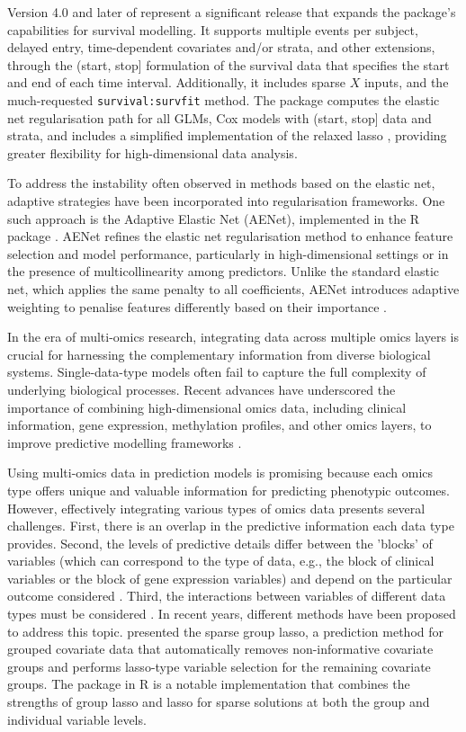 Version 4.0 and later of  \citep{friedman2023glmnet} represent a significant release that expands the package's capabilities for survival modelling. It supports multiple events per subject, delayed entry, time-dependent covariates and/or strata, and other extensions, through the (start, stop] formulation of the survival data that specifies the start and end of each time interval. Additionally, it includes sparse $X$ inputs, and the much-requested \texttt{survival:survfit} method. The package computes the elastic net regularisation path for all GLMs, Cox models with (start, stop] data and strata, and includes a simplified implementation of the relaxed lasso \citep{hastie2020best}, providing greater flexibility for high-dimensional data analysis.

To address the instability often observed in methods based on the elastic net, adaptive strategies have been incorporated into regularisation frameworks. One such approach is the Adaptive Elastic Net (AENet), implemented in the R package . AENet refines the elastic net regularisation method to enhance feature selection and model performance, particularly in high-dimensional settings or in the presence of multicollinearity among predictors. Unlike the standard elastic net, which applies the same penalty to all coefficients, AENet introduces adaptive weighting to penalise features differently based on their importance \citep{zou2009adaptive}.

In the era of multi-omics research, integrating data across multiple omics layers is crucial for harnessing the complementary information from diverse biological systems. Single-data-type models often fail to capture the full complexity of underlying biological processes. Recent advances have underscored the importance of combining high-dimensional omics data, including clinical information, gene expression, methylation profiles, and other omics layers, to improve predictive modelling frameworks \citep{huang2017more}.

Using multi-omics data in prediction models is promising because each omics type offers unique and valuable information for predicting phenotypic outcomes.  However, effectively integrating various types of omics data presents several challenges. First, there is an overlap in the predictive information each data type provides. Second, the levels of predictive details differ between the 'blocks' of variables (which can correspond to the type of data, e.g., the block of clinical variables or the block of gene expression variables) and depend on the particular outcome considered \citep{QingZhaoCombinmultidimensional}. Third, the interactions between variables of different data types must be considered \citep{huang2017more}. In recent years, different methods have been proposed to address this topic. \cite{Simonsparse-group} presented the sparse group lasso, a prediction method for grouped covariate data that automatically removes non-informative covariate groups and performs lasso-type variable selection for the remaining covariate groups. The  package \citep{simon2018package} in R is a notable implementation that combines the strengths of group lasso and lasso for sparse solutions at both the group and individual variable levels.

